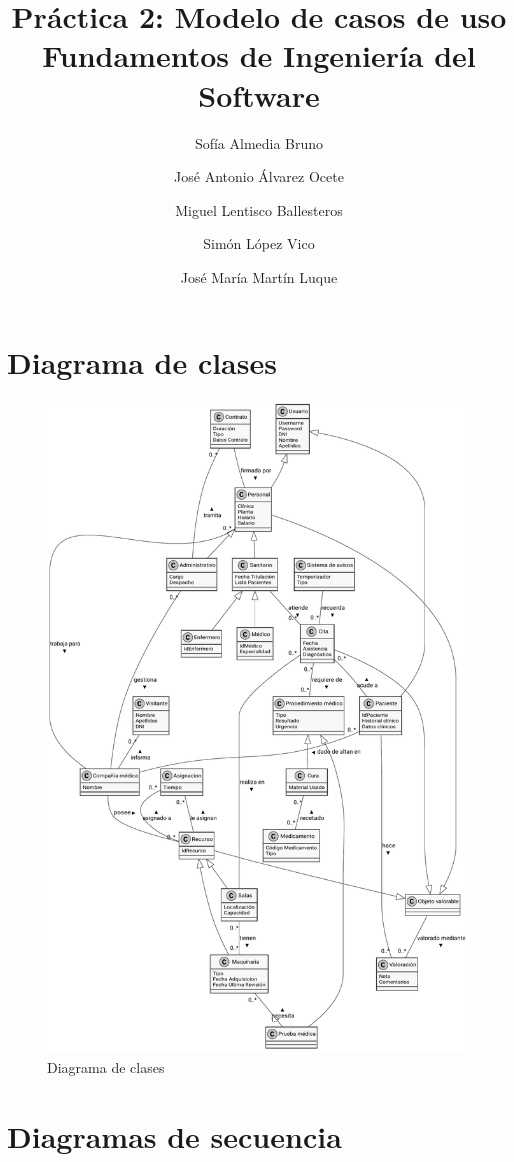 \documentclass[11pt,a4paper]{article}
\title{Práctica 2: Modelo de casos de uso \large\\ Fundamentos de Ingeniería del Software}
\author{Sofía Almedia Bruno \and José Antonio Álvarez Ocete \and Miguel Lentisco Ballesteros \and Simón López Vico \and José María Martín Luque}
\begin{document}
\maketitle

\section{Diagrama de clases}

\begin{figure}[H]
	\caption{Diagrama de clases}
	\centering
	\includegraphics{diagramas/pdf/diagramaClases.pdf}
\end{figure}

\section{Diagramas de secuencia}
\end{document}
